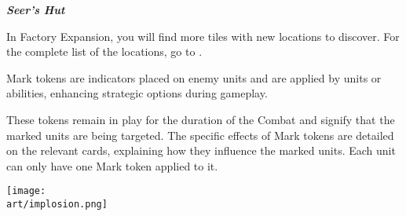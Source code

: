 \begin{multicols*}{2}
{  \footnotesize
  \centering
  \textbf{\textit{\textcolor{darkcandyapplered}{Seer's Hut}}} \par
}

\vspace*{\fill}
\columnbreak



In Factory Expansion, you will find more tiles with new locations to discover.
For the complete list of the locations, go to .
\medskip


\parbox{0.7\hsize}{Mark tokens are indicators placed on enemy units and are applied by units or abilities, enhancing strategic options during gameplay.}\par\smallskip
These tokens remain in play for the duration of the Combat and signify that the marked units are being targeted.
The specific effects of Mark tokens are detailed on the relevant cards, explaining how they influence the marked units.
Each unit can only have one Mark token applied to it.\par

\vfill
\hspace{2em}
\texttt{[image: \\art/implosion.png]}
\vfill

\end{multicols*}
